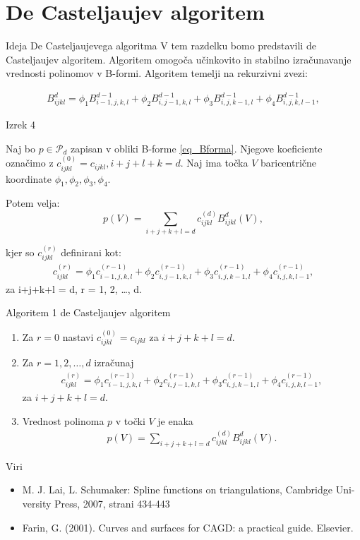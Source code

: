 \documentclass{beamer}
\begin{document}
\section{De Casteljaujev algoritem}
\begin{frame}{Ideja De Casteljaujevega algoritma}
V tem razdelku bomo predstavili de Casteljaujev algoritem. Algoritem omogoča učinkovito in stabilno izračunavanje vrednosti polinomov v B-formi. Algoritem temelji na rekurzivni zvezi:

\begin{align*}
 B_{ijkl}^d = \phi_1 B_{i-1,j,k,l}^{d-1} + \phi_2 B_{i,j-1,k,l}^{d-1} + \phi_3 B_{i,j,k-1,l}^{d-1} + \phi_4 B_{i,j,k,l-1}^{d-1}, 
\end{align*}
\end{frame}


\begin{frame}{Izrek 4}
\begin{theorem}
    Naj bo $p \in \mathcal{P}_d$ zapisan v obliki B-forme \eqref{eq_Bforma}. Njegove koeficiente označimo z $c_{ijkl}^{(0)} = c_{ijkl}, i+j+l+k = d$.
    Naj ima točka $V$ baricentrične koordinate $\phi_1, \phi_2, \phi_3, \phi_4$.

    Potem velja:
    $$
    p(V) = \sum_{i+j+k+l = d} c_{ijkl}^{(d)} B_{ijkl}^d(V),
    $$

    kjer so  $c_{ijkl}^{(r)}$ definirani kot:
    \begin{align*}
        c_{ijkl}^{(r)} = \phi_1 c_{i-1,j,k,l}^{(r-1)} + \phi_2 c_{i,j-1,k,l}^{(r-1)} + \phi_3 c_{i,j,k-1,l}^{(r-1)} + \phi_4 c_{i,j,k,l-1}^{(r-1)},
    \end{align*}
    za i+j+k+l = d, r = 1, 2, \ldots, d.
\end{theorem}
\end{frame}


\begin{frame}{Algoritem 1}
de Casteljaujev algoritem
    \begin{enumerate}
        \item Za $r = 0$ nastavi $c_{ijkl}^{(0)} = c_{ijkl}$ za $i+j+k+l = d$.
        \item Za $r = 1, 2, \ldots, d$ izračunaj
        \begin{align*}
            c_{ijkl}^{(r)} = \phi_1 c_{i-1,j,k,l}^{(r-1)} + \phi_2 c_{i,j-1,k,l}^{(r-1)} + \phi_3 c_{i,j,k-1,l}^{(r-1)} + \phi_4 c_{i,j,k,l-1}^{(r-1)},
        \end{align*}
        za $i+j+k+l = d$.
        \item Vrednost polinoma $p$ v točki $V$ je enaka
        \begin{align*}
            p(V) = \sum_{i+j+k+l = d} c_{ijkl}^{(d)} B_{ijkl}^d(V).
        \end{align*}
    \end{enumerate}

\end{frame}

\begin{frame}{Viri}
    \begin{itemize}
        \item  M. J. Lai, L. Schumaker: Spline functions on triangulations, Cambridge Uni-
        versity Press, 2007, strani 434-443
        \item Farin, G. (2001). Curves and surfaces for CAGD: a practical guide. Elsevier.
    \end{itemize}
\end{frame}
\end{document}
